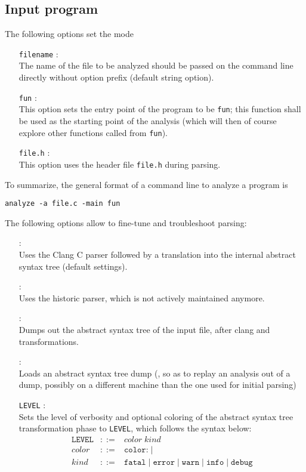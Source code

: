 \subsection{Input program}
\label{s:opt:in}
The following options set the mode 
\begin{itemize}
\item[\texttt{filename}]: \\
  The name of the file to be analyzed should be passed on the command
  line directly without option prefix (default string option).
\item[\doption{-main} \texttt{fun}]: \\
  This option sets the entry point of the program to be \texttt{fun};
  this function shall be used as the starting point of the analysis
  (which will then of course explore other functions called from
  \texttt{fun}).
\item[\doption{-header} \texttt{file.h}]: \\
  This option uses the header file \texttt{file.h} during parsing.
\end{itemize}
To summarize, the general format of a command line to analyze a
program is
\begin{verbatim}
analyze -a file.c -main fun
\end{verbatim}
The following options allow to fine-tune and troubleshoot parsing:
\label{opt:parsing}
\begin{itemize}
\item[\doption{-clang-parser}] \optadv: \\
  Uses the Clang C parser followed by a translation into the \memcad
  internal abstract syntax tree (default settings).
\item[\doption{-old-parser}] \optadv: \\
  Uses the historic \memcad parser, which is not actively maintained
  anymore.
\item[\doption{-dump-parse}] \optadv: \\
  Dumps out the abstract syntax tree of the input file, after clang and
  transformations.
\item[\doption{-load-dump}] \optadv: \\
  Loads an abstract syntax tree dump (\eg, so as to replay an analysis
  out of a dump, possibly on a different machine than the one used for
  initial parsing)
\item[\doption{-tlog} \texttt{LEVEL}] \optdev: \\
  Sets the level of verbosity and optional coloring of the abstract
  syntax tree transformation phase to \texttt{LEVEL}, which follows
  the syntax below:
  \[
  \begin{array}{rcl}
    \texttt{LEVEL} & ::= & color \; kind \\
    color & ::= & \texttt{color:} \; | \; \\
    kind  & ::= & \texttt{fatal} \; | \; \texttt{error} \; | \;
    \texttt{warn} \; | \; \texttt{info} \; | \; \texttt{debug} \\
  \end{array}
  \]
\end{itemize}

